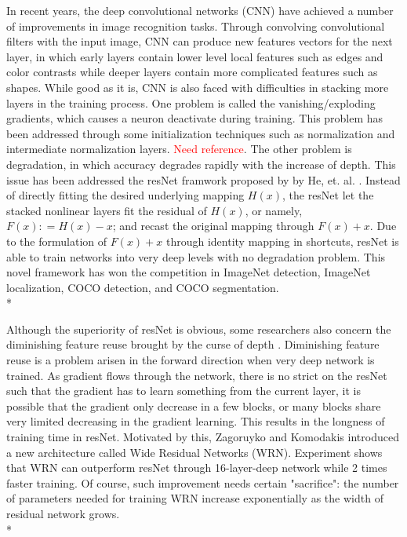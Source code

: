 \documentclass{article} %
\begin{document}
In recent years, the deep convolutional networks (CNN) have achieved a number of improvements in image recognition tasks. Through convolving convolutional filters with the input image, CNN can produce new features vectors for the next layer, in which early layers contain lower level local features such as edges and color contrasts while deeper layers contain more complicated features such as shapes. While good as it is, CNN is also faced with difficulties in stacking more layers in the training process. One problem is called the vanishing/exploding gradients, which causes a neuron deactivate during training. This problem has been addressed through some initialization techniques such as normalization and intermediate normalization layers. \textcolor{red}{Need reference}. The other problem is degradation, in which accuracy degrades rapidly with the increase of depth. This issue has been addressed the resNet framwork proposed by by He, et. al. \cite{he2015deep}. Instead of directly fitting the desired underlying mapping $H(x)$, the resNet let the stacked nonlinear layers fit the residual of $H(x)$, or namely, $F(x): = H(x) - x$; and recast the original mapping through $F(x)+x$. Due to the formulation of $F(x) + x$ through identity mapping in shortcuts, resNet is able to train networks into very deep levels with no degradation problem. This novel framework has won the competition in ImageNet detection, ImageNet localization, COCO detection, and COCO segmentation.\\*

Although the superiority of resNet is obvious, some researchers also concern the diminishing feature reuse brought by the curse of depth \cite{zagoruyko2016wide}. Diminishing feature reuse is a problem arisen in the forward direction when very deep network is trained. As gradient flows through the network, there is no strict on the resNet such that the gradient has to learn something from the current layer, it is possible that the gradient only decrease in a few blocks, or many blocks share very limited decreasing in the gradient learning. This results in the longness of training time in resNet. Motivated by this, Zagoruyko and Komodakis  \cite{zagoruyko2016wide} introduced a new architecture called Wide Residual Networks (WRN). Experiment shows that WRN can outperform resNet through 16-layer-deep network while 2 times faster training. Of course, such improvement needs certain "sacrifice": the number of parameters needed for training WRN increase exponentially as the width of residual network grows. \\*
\end{document}
